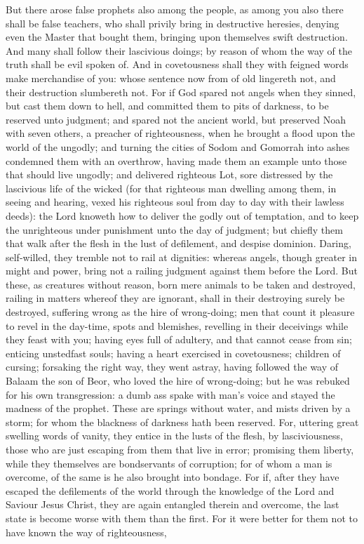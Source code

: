 But there arose false prophets also among the people, as among you also there shall be false teachers, who shall privily bring in destructive heresies, denying even the Master that bought them, bringing upon themselves swift destruction. And many shall follow their lascivious doings; by reason of whom the way of the truth shall be evil spoken of. And in covetousness shall they with feigned words make merchandise of you: whose sentence now from of old lingereth not, and their destruction slumbereth not. For if God spared not angels when they sinned, but cast them down to hell, and committed them to pits of darkness, to be reserved unto judgment; and spared not the ancient world, but preserved Noah with seven others, a preacher of righteousness, when he brought a flood upon the world of the ungodly; and turning the cities of Sodom and Gomorrah into ashes condemned them with an overthrow, having made them an example unto those that should live ungodly; and delivered righteous Lot, sore distressed by the lascivious life of the wicked (for that righteous man dwelling among them, in seeing and hearing, vexed his righteous soul from day to day with their lawless deeds): the Lord knoweth how to deliver the godly out of temptation, and to keep the unrighteous under punishment unto the day of judgment; but chiefly them that walk after the flesh in the lust of defilement, and despise dominion. Daring, self-willed, they tremble not to rail at dignities: whereas angels, though greater in might and power, bring not a railing judgment against them before the Lord. But these, as creatures without reason, born mere animals to be taken and destroyed, railing in matters whereof they are ignorant, shall in their destroying surely be destroyed, suffering wrong as the hire of wrong-doing; men that count it pleasure to revel in the day-time, spots and blemishes, revelling in their deceivings while they feast with you; having eyes full of adultery, and that cannot cease from sin; enticing unstedfast souls; having a heart exercised in covetousness; children of cursing; forsaking the right way, they went astray, having followed the way of Balaam the son of Beor, who loved the hire of wrong-doing; but he was rebuked for his own transgression: a dumb ass spake with man’s voice and stayed the madness of the prophet. These are springs without water, and mists driven by a storm; for whom the blackness of darkness hath been reserved. For, uttering great swelling words of vanity, they entice in the lusts of the flesh, by lasciviousness, those who are just escaping from them that live in error; promising them liberty, while they themselves are bondservants of corruption; for of whom a man is overcome, of the same is he also brought into bondage. For if, after they have escaped the defilements of the world through the knowledge of the Lord and Saviour Jesus Christ, they are again entangled therein and overcome, the last state is become worse with them than the first. For it were better for them not to have known the way of righteousness, 